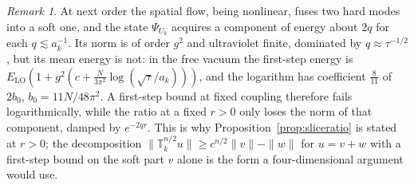 \documentclass[11pt]{amsart}
\theoremstyle{definition}
\theoremstyle{remark}
\newtheorem{remark}[theorem]{Remark}
\numberwithin{equation}{section}
\begin{document}
\begin{remark}
At next order the spatial flow, being nonlinear, fuses two hard modes into a
soft one, and the state $\Psi_{U_k}$ acquires a component of energy about
$2q$ for each $q\lesssim a_k^{-1}$. Its norm is of order $g^2$ and ultraviolet
finite, dominated by $q\approx\tau^{-1/2}$, but its mean energy is not: in the
free vacuum the first-step energy is $E_{\mathrm{LO}}(1+g^2(c+\frac
N{3\pi^2}\log(\sqrt\tau/a_k)))$, and the logarithm has coefficient
$\frac8{11}$ of $2b_0$, $b_0=11N/48\pi^2$. A first-step bound at fixed
coupling therefore fails logarithmically, while the ratio at a fixed $r>0$
only loses the norm of that component, damped by $e^{-2qr}$. This is why
Proposition~\ref{prop:sliceratio} is stated at $r>0$; the decomposition
$\|\mathbb T_k^{n/2}u\|\ge c^{n/2}\|v\|-\|w\|$ for $u=v+w$ with a first-step
bound on the soft part $v$ alone is the form a four-dimensional argument
would use.
\end{remark}
\end{document}
